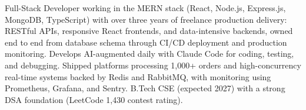 \documentclass[11pt,a4paper,sans]{moderncv}
\begin{document}
\makecvtitle


\vspace{6pt}
\small{Full-Stack Developer working in the MERN stack (React, Node.js, Express.js, MongoDB, TypeScript) with over three years of freelance production delivery: RESTful APIs, responsive React frontends, and data-intensive backends, owned end to end from database schema through CI/CD deployment and production monitoring. Develops AI-augmented daily with Claude Code for coding, testing, and debugging. Shipped platforms processing 1,000+ orders and high-concurrency real-time systems backed by Redis and RabbitMQ, with monitoring using Prometheus, Grafana, and Sentry. B.Tech CSE (expected 2027) with a strong DSA foundation (LeetCode 1,430 contest rating).}

\end{document}

